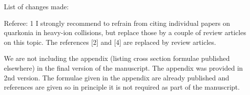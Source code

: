 \documentclass[aps,prc,preprint,superscriptaddress,showpacs,showkeys,amsmath]{revtex4-1}
\begin{document}
List of changes made: 

Referee: 1  I strongly recommend to refrain from citing individual papers on quarkonia in heavy-ion collisions, but replace those by a couple of review articles on this topic.
The references [2] and [4] are replaced by review articles. 

We are not including the appendix (listing cross section formulae published elsewhere) in the final version of the manuscript. The appendix was provided in 2nd version. The formulae given in the appendix are already published and references are given so in principle it is not required as part of the manuscript.
\end{document}
